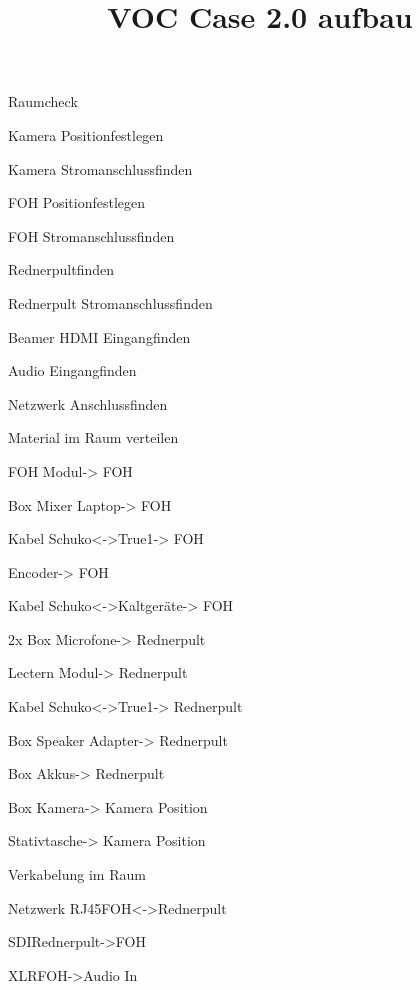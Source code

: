 \def\papersize{4}




\title{VOC Case 2.0 aufbau}

\begin{checklist}{Raumcheck}
  \item{Kamera Position}{festlegen}
  \item{Kamera Stromanschluss}{finden}
  \item{FOH Position}{festlegen}
  \item{FOH Stromanschluss}{finden}
  \item{Rednerpult}{finden}
  \item{Rednerpult Stromanschluss}{finden}
  \item{Beamer HDMI Eingang}{finden}
  \item{Audio Eingang}{finden}
  \item{Netzwerk Anschluss}{finden}
\end{checklist}

\begin{checklist}{Material im Raum verteilen}
  \item{FOH Modul}{-> FOH}
  \item{Box Mixer Laptop}{-> FOH}
  \item{Kabel Schuko<->True1}{-> FOH}
    \item{Encoder}{-> FOH}
    \item{Kabel Schuko<->Kaltgeräte}{-> FOH}
  \item{2x Box Microfone}{-> Rednerpult}
  \item{Lectern Modul}{-> Rednerpult}
  \item{Kabel Schuko<->True1}{-> Rednerpult}
  \item{Box Speaker Adapter}{-> Rednerpult}
  \item{Box Akkus}{-> Rednerpult}
  \item{Box Kamera}{-> Kamera Position}
  \item{Stativtasche}{-> Kamera Position}
\end{checklist}

\begin{checklist}{Verkabelung im Raum}
  \item{Netzwerk RJ45}{FOH<->Rednerpult}
  \item{SDI}{Rednerpult->FOH}
  \item{XLR}{FOH->Audio In}
\end{checklist}

